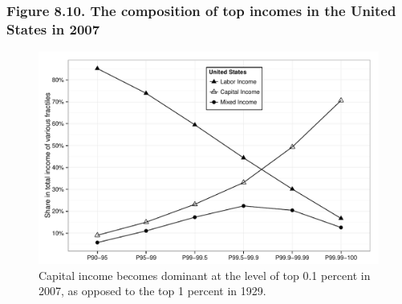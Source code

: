 \documentclass[t]{beamer}\usepackage[]{graphicx}\usepackage[]{color}
\newenvironment{knitrout}{}{} %
\begin{document}
\begin{frame}[label=Figure_8_10,fragile]
\frametitle{Figure 8.10. The composition of top incomes in the United States in 2007}
\begin{figure}[t]
\begin{minipage}[b]{\textwidth}
\centering
\begin{knitrout}\footnotesize
{}\color{fgcolor}

{\centering \includegraphics[width=1\linewidth]{figures/bw/Figure_8_10} 

}



\end{knitrout}
\caption{Capital income becomes dominant at the level of top 0.1 percent in 2007, as opposed to the top 1 percent in 1929.}
\end{minipage}
\end{figure}
\end{frame}
\end{document}
